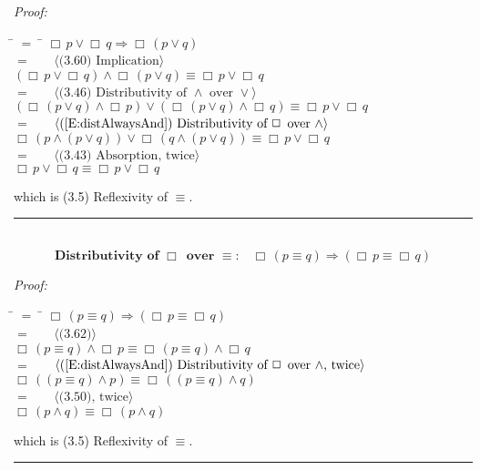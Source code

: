 \documentclass[fleqn, leqno]{article}
\newcommand{\lgap}{2pt}                             %
\newcommand{\mymathindent}{24pt}                    %
\newcommand{\Always}{\Box\,}
\newcommand{\myqed}{\hfill\rule[-.23ex]{1.2ex}{2.0ex}}
\newcommand{\Gll} {\langle}                         %
\newcommand{\Ggg} {\rangle}                         %
\newcommand{\Hint}[1]     {\ \ \ $\Gll              \mbox{#1} \Ggg$ }   %
\begin{document}
\emph{Proof:}
\begin{tabbing}
\hspace{\mymathindent} \= $= \;$ \= \kill
  \> \>   $\Always p \lor \Always q \Rightarrow \Always(p \lor q)$\\[\lgap]
  \> $=$  \>  \Hint{(3.60) Implication}\\[\lgap]
  \> \>   $(\Always p \lor \Always q) \land \Always(p \lor q) \equiv \Always p \lor \Always q$\\[\lgap]
  \> $=$  \>  \Hint{(3.46) Distributivity of $\land$ over $\lor$}\\[\lgap]
  \> \>   $(\Always (p \lor q) \land \Always p) \lor (\Always (p \lor q) \land \Always q) \equiv \Always p \lor \Always q$\\[\lgap]
  \> $=$  \>  \Hint{(\ref{E:distAlwaysAnd}) Distributivity of $\Always$ over $\land$}\\[\lgap]
  \> \>   $\Always(p \land (p \lor q)) \lor \Always(q \land (p \lor q)) \equiv \Always p \lor \Always q$\\[\lgap]
  \> $=$  \>  \Hint{(3.43) Absorption, twice}\\[\lgap]
  \> \>   $\Always p \lor \Always q \equiv \Always p \lor \Always q$\\[\lgap]
\end{tabbing}
which is (3.5) Reflexivity of $\equiv$. \myqed\\[\lgap]


\begin{equation}\label{E:distAlwaysEquiv}
\textbf{Distributivity of $\Always$ over $\equiv$:}\quad \Always (p \equiv q) \Rightarrow (\Always p \equiv \Always q)
\end{equation}

\emph{Proof:}
\begin{tabbing}
\hspace{\mymathindent} \= $= \;$ \= \kill
  \> \>   $\Always (p \equiv q) \Rightarrow (\Always p \equiv \Always q)$\\[\lgap]
  \> $=$  \>  \Hint{(3.62)}\\[\lgap]
  \> \>   $\Always (p \equiv q) \land \Always p \equiv \Always (p \equiv q) \land \Always q$\\[\lgap]
  \> $=$  \>  \Hint{(\ref{E:distAlwaysAnd}) Distributivity of $\Always$ over $\land$, twice}\\[\lgap]
  \> \>   $\Always((p \equiv q) \land p) \equiv \Always((p \equiv q) \land q)$\\[\lgap]
  \> $=$  \>  \Hint{(3.50), twice}\\[\lgap]
  \> \>   $\Always(p \land q) \equiv \Always (p \land q)$\\[\lgap]
\end{tabbing}
which is (3.5) Reflexivity of $\equiv$. \myqed\\[\lgap]
\end{document}
